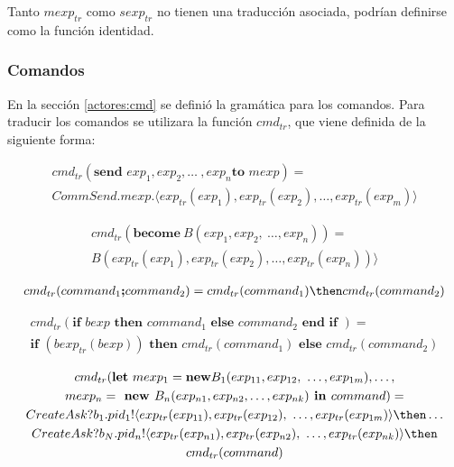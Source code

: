 Tanto $mexp_{tr}$ como $sexp_{tr}$ no tienen una traducción asociada, podrían definirse como la función identidad.

\subsubsection*{Comandos}

En la sección \ref{actores:cmd} se definió la gramática para los comandos. Para traducir los comandos se utilizara la función $cmd_{tr}$, que viene definida de la siguiente forma:

\begin{multline*}
cmd_{tr} (\textbf{send } exp_1, exp_2, \ldots\ , exp_n \textbf{to } mexp) = \\
CommSend.mexp. \langle exp_{tr}(exp_1), exp_{tr}(exp_2), \ldots, exp_{tr}(exp_m) \rangle
\end{multline*}

\begin{multline*}
cmd_{tr} (\textbf{become}\ B(exp_1, exp_2,\ \ldots, exp_n)) = \\
B(exp_{tr}(exp_1), exp_{tr}(exp_2), \ldots, exp_{tr}(exp_n)) \rangle
\end{multline*}

\begin{multline*}
cmd_{tr} (command_1 \textbf{;} command_2) = cmd_{tr}(command_1) \then cmd_{tr}(command_2)
\end{multline*}

\begin{multline*}
cmd_{tr} (\textbf{if } bexp \textbf{ then } command_1 \textbf{ else } command_2 \textbf{ end if }) = \\
\textbf{if } (bexp_{tr}(bexp))\textbf{ then } cmd_{tr}(command_1) \textbf{ else } cmd_{tr}(command_2)
\end{multline*}

\begin{multline*}
cmd_{tr}( \textbf{let}\ mexp_1 = \textbf{new} B_1(exp_{11}, exp_{12},\ \ldots, exp_{1m}), \ldots, \\
mexp_n = \textbf{ new }B_n(exp_{n1}, exp_{n2},\ldots, exp_{nk}) \textbf{ in }command) = \\
CreateAsk?b_1.pid_1! \langle exp_{tr}(exp_{11}), exp_{tr}(exp_{12}),\ \ldots, exp_{tr}(exp_{1m}) \rangle \then \ldots \\
CreateAsk?b_N.pid_n! \langle exp_{tr}(exp_{n1}), exp_{tr}(exp_{n2}),\ \ldots, exp_{tr}(exp_{nk}) \rangle \then  \\ 
cmd_{tr}(command)
\end{multline*}

